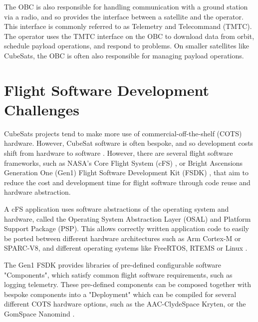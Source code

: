 \documentclass[../report.tex]{subfiles}
\begin{document}
The OBC is also responsible for handling communication with a ground station
via a radio, and so provides the interface between a satellite and the
operator. This interface is commonly referred to as Telemetry and Telecommand
(TMTC). The operator uses the TMTC interface on the OBC to download data from
orbit, schedule payload operations, and respond to problems. On smaller
satellites like CubeSats, the OBC is often also responsible for managing
payload operations.



\section{Flight Software Development Challenges}

CubeSats projects tend to make more use of commercial-off-the-shelf (COTS)
hardware. However, CubeSat software is often bespoke, and so development costs
shift from hardware to software \citep{Cubesat_Handbook_OBSW}. However, there
are several flight software frameworks, such as NASA's Core Flight System (cFS)
\citep{Nasa_cFS}, or Bright Ascensions Generation One (Gen1) Flight Software
Development Kit (FSDK) \citep{Bal_FSDK}, that aim to reduce the cost and
development time for flight software through code reuse and hardware
abstraction.

A cFS application uses software abstractions of the operating system and
hardware, called the Operating System Abstraction Layer (OSAL) and Platform
Support Package (PSP). This allows correctly written application code to easily
be ported between different hardware architectures such as Arm Cortex-M or
SPARC-V8, and different operating systems like FreeRTOS, RTEMS or Linux
\citep{Nasa_cFS}.

The Gen1 FSDK provides libraries of pre-defined configurable software
"Components", which satisfy common flight software requirements, such as
logging telemetry. These pre-defined components can be composed together with
bespoke components into a "Deployment" which can be compiled for several
different COTS hardware options, such as the AAC-ClydeSpace Kryten, or the
GomSpace Nanomind \citep{Bal_Options}.
\end{document}
